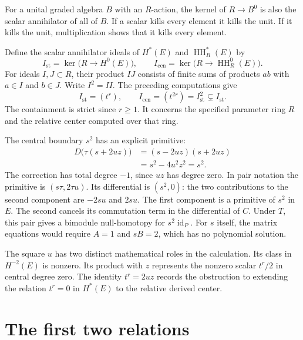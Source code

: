 For a unital graded algebra $B$ with an $R$-action, the kernel of
$R\to B^0$ is also the scalar annihilator of all of $B$.
If a scalar kills every element it kills the unit.
If it kills the unit, multiplication shows that it kills every element.

Define the scalar annihilator ideals of $H^*(E)$ and
$\operatorname{HH}_R^*(E)$ by
\[
 I_{\mathrm{st}}=\ker\bigl(R\longrightarrow H^0(E)\bigr),\qquad
 I_{\mathrm{cen}}=\ker\bigl(R\longrightarrow
                                  \operatorname{HH}_R^0(E)\bigr).
\]
For ideals $I,J\subset R$, their product $IJ$ consists of finite sums
of products $ab$ with $a\in I$ and $b\in J$. Write $I^2=II$.
The preceding computations give
\[
 I_{\mathrm{st}}=(t^r),\qquad
 I_{\mathrm{cen}}=(t^{2r})=I_{\mathrm{st}}^2
                  \subsetneq I_{\mathrm{st}}.
\]
The containment is strict since $r\geq1$.
It concerns the specified parameter ring $R$ and the relative center
computed over that ring.

The central boundary $s^2$ has an explicit primitive:
\begin{equation}\label{eq:rel-central-square}
 \begin{split}
 D\bigl(\tau(s+2uz)\bigr)
  &=(s-2uz)(s+2uz)\\
  &=s^2-4u^2z^2=s^2.
 \end{split}
\end{equation}
The correction has total degree $-1$, since $uz$ has degree zero.
In pair notation the primitive is $(s\tau,2\tau u)$.
Its differential is $(s^2,0)$: the two contributions to the second
component are $-2su$ and $2su$.
The first component is a primitive of $s^2$ in $E$.
The second cancels its commutation term in the differential of $C$.
Under $T$, this pair gives a bimodule null-homotopy for
$s^2\operatorname{id}_P$.
For $s$ itself, the matrix equations would require $A=1$ and $sB=2$,
which has no polynomial solution.

The square $u$ has two distinct mathematical roles in the calculation.
Its class in $H^{-2}(E)$ is nonzero.
Its product with $z$ represents the nonzero scalar $t^r/2$ in central
degree zero. The identity $t^r=2uz$ records the obstruction to extending
the relation $t^r=0$ in $H^*(E)$ to the relative derived center.

\section{The first two relations}
\label{sec:rel-examples}

